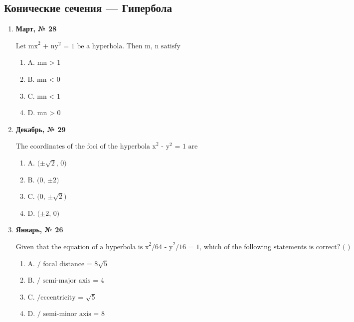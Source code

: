 \subsection*{Конические сечения — Гипербола}
\begin{enumerate}
\item \textbf{Март, № 28} \par \smallskip
$\displaystyle \text{Let mx}^{2}\text{ + ny}^{2}\text{ = 1 be a hyperbola. Then m, n satisfy}$
\begin{enumerate}
\item $\displaystyle \text{A. mn > 1}$
\item $\displaystyle \text{B. mn < 0}$
\item $\displaystyle \text{C. mn < 1}$
\item $\displaystyle \text{D. mn > 0}$
\end{enumerate}
\item \textbf{Декабрь, № 29} \par \smallskip
$\displaystyle \text{The coordinates of the foci of the hyperbola x}^{2}\text{ - y}^{2}\text{ = 1 are}$
\begin{enumerate}
\item $\displaystyle \text{A. (±}\sqrt{2}\text{, 0)}$
\item $\displaystyle \text{B. (0, ±2)}$
\item $\displaystyle \text{C. (0, ±}\sqrt{2}\text{)}$
\item $\displaystyle \text{D. (±2, 0)}$
\end{enumerate}
\item \textbf{Январь, № 26} \par \smallskip
$\displaystyle \text{Given that the equation of a hyperbola is x}^{2}\text{/64 - y}^{2}\text{/16 = 1, which of the following statements is correct? ( )}$
\begin{enumerate}
\item $\displaystyle \text{A.  / focal distance = 8}\sqrt{5}$
\item $\displaystyle \text{B.  / semi-major axis  = 4}$
\item $\displaystyle \text{C.  /eccentricity  = }\sqrt{5}$
\item $\displaystyle \text{D.  / semi-minor axis = 8}$
\end{enumerate}
\end{enumerate}

